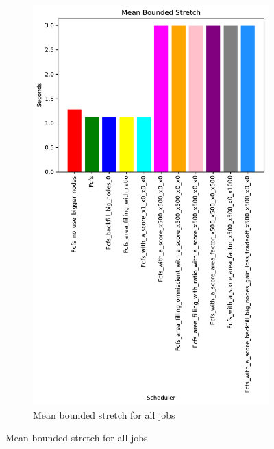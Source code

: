 \documentclass[a4paper]{article}
\begin{document}
\begin{figure}[H]\centering
\begin{subfigure}[b]{0.4\linewidth}\centering\includegraphics[width=0.7\linewidth]{MBSS/plot/Results_Size_And_Data_2022-03-01->2022-03-03_V9532_Mean_Stretch_With_a_Minimum_450_128_32_256_4_1024.pdf}\caption{Mean bounded stretch for all jobs}\label{45}\end{subfigure}

\end{figure}
\end{document}
